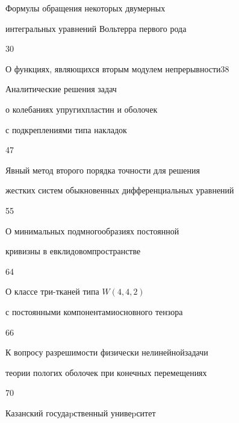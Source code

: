 {Формулы обращения некоторых двумерных\newline


интегральных уравнений Вольтерра первого рода}{30}






{О функциях, являющихся вторым модулем непрерывности}{38}






{Аналитические решения задач


о колебаниях упругих\newline пластин и оболочек


с подкреплениями типа накладок}{47}




{Явный метод второго порядка точности для решения\newline


жестких систем обыкновенных дифференциальных уравнений}{55}




{О минимальных подмногообразиях постоянной 


кривизны в евклидовом\newline пространстве}{64}




{О классе три-тканей типа $W(4,4,2)$


с постоянными компонентами\newline основного тензора}{66}




{К вопросу разрешимости физически нелинейной\newline задачи 


теории пологих оболочек при конечных перемещениях}{70}











\vfill


\noindent\raisebox{2pt}{\copyright} Казанский госудаpственный унивеpситет





